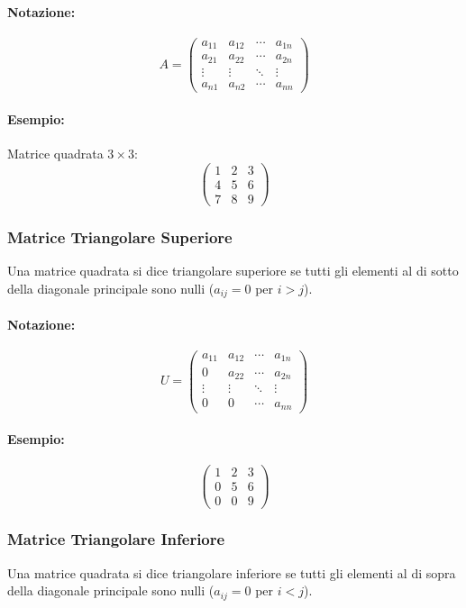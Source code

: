 \documentclass{article}
\begin{document}
\paragraph{Notazione:}
\[ A = \begin{pmatrix}
a_{11} & a_{12} & \cdots & a_{1n} \\
a_{21} & a_{22} & \cdots & a_{2n} \\
\vdots & \vdots & \ddots & \vdots \\
a_{n1} & a_{n2} & \cdots & a_{nn}
\end{pmatrix} \]
\paragraph{Esempio:} Matrice quadrata $3 \times 3$:
\[ \begin{pmatrix}
1 & 2 & 3 \\
4 & 5 & 6 \\
7 & 8 & 9
\end{pmatrix} \]

\subsubsection*{Matrice Triangolare Superiore}
Una matrice quadrata si dice triangolare superiore se tutti gli elementi al di sotto della diagonale principale sono nulli ($a_{ij} = 0$ per $i>j$).
\paragraph{Notazione:}
\[ U = \begin{pmatrix}
a_{11} & a_{12} & \cdots & a_{1n} \\
0 & a_{22} & \cdots & a_{2n} \\
\vdots & \vdots & \ddots & \vdots \\
0 & 0 & \cdots & a_{nn}
\end{pmatrix} \]
\paragraph{Esempio:}
\[ \begin{pmatrix}
1 & 2 & 3 \\
0 & 5 & 6 \\
0 & 0 & 9
\end{pmatrix} \]

\subsubsection*{Matrice Triangolare Inferiore}
Una matrice quadrata si dice triangolare inferiore se tutti gli elementi al di sopra della diagonale principale sono nulli ($a_{ij} = 0$ per $i<j$).
\end{document}
